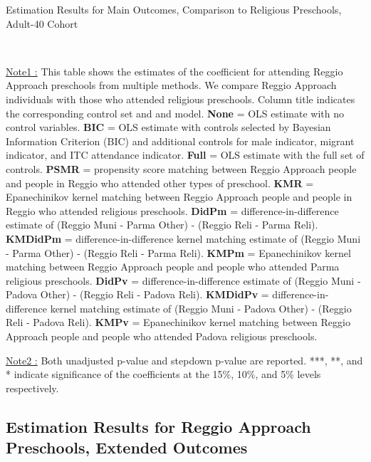 \begin{table}[H] \caption{Estimation Results for Main Outcomes, Comparison to Religious Preschools, Adult-40 Cohort} \label{ols-M-adult40-reg-reli}
\scalebox{0.59}{}
\vspace{1ex} \\
\footnotesize\raggedright{\underline{Note1 :} This table shows the estimates of the coefficient for attending Reggio Approach preschools from multiple methods. We compare Reggio Approach individuals with those who attended religious preschools. Column title indicates the corresponding control set and and model. \textbf{None} = OLS estimate with no control variables. \textbf{BIC} = OLS estimate with controls selected by Bayesian Information Criterion (BIC) and additional controls for male indicator, migrant indicator, and ITC attendance indicator. \textbf{Full} = OLS estimate with the full set of controls. \textbf{PSMR} =  propensity score matching between Reggio Approach people and people in Reggio who attended other types of preschool. \textbf{KMR} = Epanechinikov kernel matching between Reggio Approach people and people in Reggio who attended religious preschools. \textbf{DidPm} = difference-in-difference estimate of (Reggio Muni - Parma Other) - (Reggio Reli - Parma Reli). \textbf{KMDidPm} = difference-in-difference kernel matching estimate of (Reggio Muni - Parma Other) - (Reggio Reli - Parma Reli). \textbf{KMPm} = Epanechinikov kernel matching between Reggio Approach people and people who attended Parma religious preschools. \textbf{DidPv} = difference-in-difference estimate of (Reggio Muni - Padova Other) - (Reggio Reli - Padova Reli). \textbf{KMDidPv} = difference-in-difference kernel matching estimate of (Reggio Muni - Padova Other) - (Reggio Reli - Padova Reli).  \textbf{KMPv} = Epanechinikov kernel matching between Reggio Approach people and people who attended Padova religious preschools.} 

\footnotesize\raggedright{\underline{Note2 :} Both unadjusted p-value and stepdown p-value are reported. ***, **, and * indicate significance of the coefficients at the 15\%, 10\%, and 5\% levels respectively.}

\end{table}




\subsection{Estimation Results for Reggio Approach Preschools, Extended Outcomes}  \label{appsec:extended-outcome}
